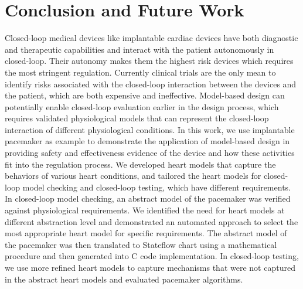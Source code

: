 \chapter{Conclusion and Future Work}
Closed-loop medical devices like implantable cardiac devices have both diagnostic and therapeutic capabilities and interact with the patient autonomously in closed-loop. Their autonomy makes them the highest risk devices which requires the most stringent regulation. Currently clinical trials are the only mean to identify risks associated with the closed-loop interaction between the devices and the patient, which are both expensive and ineffective. Model-based design can potentially enable closed-loop evaluation earlier in the design process, which requires validated physiological models that can represent the closed-loop interaction of different physiological conditions. In this work, we use implantable pacemaker as example to demonstrate the application of model-based design in providing safety and effectiveness evidence of the device and how these activities fit into the regulation process. We developed heart models that capture the behaviors of various heart conditions, and tailored the heart models for closed-loop model checking and closed-loop testing, which have different requirements. In closed-loop model checking, an abstract model of the pacemaker was verified against physiological requirements. We identified the need for heart models at different abstraction level and demonstrated an automated approach to select the most appropriate heart model for specific requirements. The abstract model of the pacemaker was then translated to Stateflow chart using a mathematical procedure and then generated into C code implementation. In closed-loop testing, we use more refined heart models to capture mechanisms that were not captured in the abstract heart models and evaluated pacemaker algorithms. 


